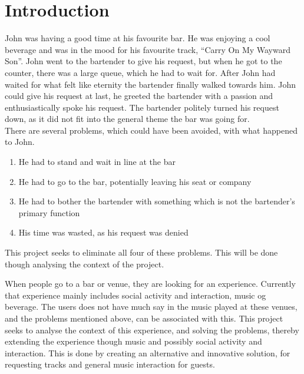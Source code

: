\chapter{Introduction}
John was having a good time at his favourite bar. He was enjoying a cool beverage and was in the mood for his favourite track, \enquote{Carry On My Wayward Son}. John went to the bartender to give his request, but when he got to the counter, there was a large queue, which he had to wait for. After John had waited for what felt like eternity the bartender finally walked towards him. John could give his request at last, he greeted the bartender with a passion and enthusiastically spoke his request. The bartender politely turned his request down, as it did not fit into the general theme the bar was going for.\\

There are several problems, which could have been avoided, with what happened to John.
\begin{enumerate}
	\item He had to stand and wait in line at the bar
	\item He had to go to the bar, potentially leaving his seat or company
	\item He had to bother the bartender with something which is not the bartender's primary function
	\item His time was wasted, as his request was denied
\end{enumerate}

This project seeks to eliminate all four of these problems. This will be done though analysing the context of the project.

When people go to a bar or venue, they are looking for an experience. Currently that experience mainly includes social activity and interaction, music og beverage. The users does not have much say in the music played at these venues, and the problems mentioned above, can be associated with this. This project seeks to analyse the context of this experience, and solving the problems, thereby extending the experience though music and possibly social activity and interaction. This is done by creating an alternative and innovative solution, for requesting tracks and general music interaction for guests.

